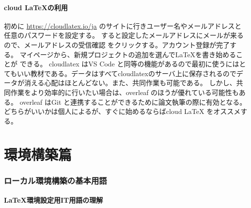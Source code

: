 \documentclass{ltjsarticle}
\begin{document}
\subsection{cloud \LaTeX の利用}
初めに
\url{https://cloudlatex.io/ja}
のサイトに行きユーザー名やメールアドレスと任意のパスワードを設定する。
すると設定したメールアドレスにメールが来るので、メールアドレスの受信確認
をクリックする。アカウント登録が完了する。
マイページから、新規プロジェクトの追加を選んで\LaTeX を書き始めることが
できる。
cloudlatex はVS Code と同等の機能があるので最初に使うにはとてもいい教材である。データはすべてcloudlatexのサーバ上に保存されるのでデータが消える心配はほとんどない。また、共同作業も可能である。
しかし、共同作業をより効率的に行いたい場合は、overleaf のほうが優れている可能性もある。
overleaf はGit と連携することができるために論文執筆の際に有効となる。どちらがいいかは個人によるが、すぐに始めるならばcloud LaTeX をオススメする。
\part{環境構築篇}
\section{ローカル環境構築の基本用語}
\subsection{\LaTeX 環境設定用IT用語の理解}
\end{document}
